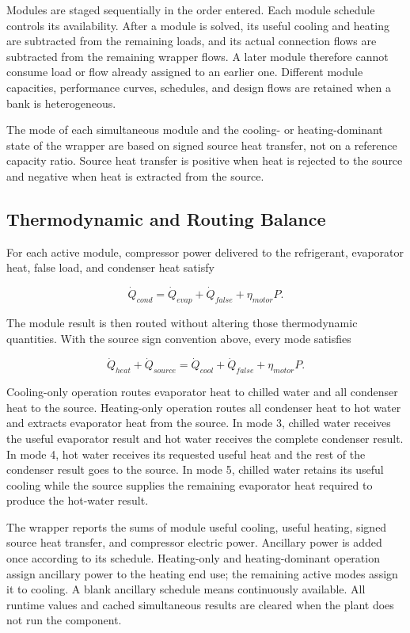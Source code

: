 Modules are staged sequentially in the order entered. Each module schedule controls its availability. After a module is solved, its useful cooling and heating are subtracted from the remaining loads, and its actual connection flows are subtracted from the remaining wrapper flows. A later module therefore cannot consume load or flow already assigned to an earlier one. Different module capacities, performance curves, schedules, and design flows are retained when a bank is heterogeneous.

The mode of each simultaneous module and the cooling- or heating-dominant state of the wrapper are based on signed source heat transfer, not on a reference capacity ratio. Source heat transfer is positive when heat is rejected to the source and negative when heat is extracted from the source.

\subsection{Thermodynamic and Routing Balance}
\label{thermodynamic-and-routing-balance}

For each active module, compressor power delivered to the refrigerant, evaporator heat, false load, and condenser heat satisfy

\begin{equation}
\dot Q_{cond}=\dot Q_{evap}+\dot Q_{false}+\eta_{motor}P.
\end{equation}

The module result is then routed without altering those thermodynamic quantities. With the source sign convention above, every mode satisfies

\begin{equation}
\dot Q_{heat}+\dot Q_{source}=\dot Q_{cool}+\dot Q_{false}+\eta_{motor}P.
\end{equation}

Cooling-only operation routes evaporator heat to chilled water and all condenser heat to the source. Heating-only operation routes all condenser heat to hot water and extracts evaporator heat from the source. In mode 3, chilled water receives the useful evaporator result and hot water receives the complete condenser result. In mode 4, hot water receives its requested useful heat and the rest of the condenser result goes to the source. In mode 5, chilled water retains its useful cooling while the source supplies the remaining evaporator heat required to produce the hot-water result.

The wrapper reports the sums of module useful cooling, useful heating, signed source heat transfer, and compressor electric power. Ancillary power is added once according to its schedule. Heating-only and heating-dominant operation assign ancillary power to the heating end use; the remaining active modes assign it to cooling. A blank ancillary schedule means continuously available. All runtime values and cached simultaneous results are cleared when the plant does not run the component.

